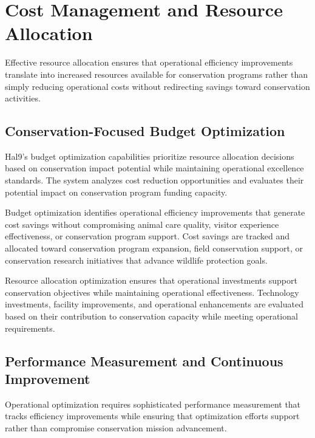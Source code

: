 \documentclass[
  Letterpaper,
]{scrbook}
\begin{document}
\section{Cost Management and Resource
Allocation}\label{cost-management-and-resource-allocation}

Effective resource allocation ensures that operational efficiency
improvements translate into increased resources available for
conservation programs rather than simply reducing operational costs
without redirecting savings toward conservation activities.

\subsection{Conservation-Focused Budget
Optimization}\label{conservation-focused-budget-optimization}

Hal9's budget optimization capabilities prioritize resource allocation
decisions based on conservation impact potential while maintaining
operational excellence standards. The system analyzes cost reduction
opportunities and evaluates their potential impact on conservation
program funding capacity.

Budget optimization identifies operational efficiency improvements that
generate cost savings without compromising animal care quality, visitor
experience effectiveness, or conservation program support. Cost savings
are tracked and allocated toward conservation program expansion, field
conservation support, or conservation research initiatives that advance
wildlife protection goals.

Resource allocation optimization ensures that operational investments
support conservation objectives while maintaining operational
effectiveness. Technology investments, facility improvements, and
operational enhancements are evaluated based on their contribution to
conservation capacity while meeting operational requirements.

\subsection{Performance Measurement and Continuous
Improvement}\label{performance-measurement-and-continuous-improvement}

Operational optimization requires sophisticated performance measurement
that tracks efficiency improvements while ensuring that optimization
efforts support rather than compromise conservation mission advancement.
\end{document}

